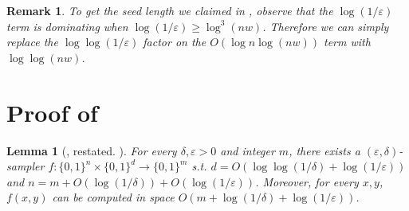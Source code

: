 \documentclass[10pt,a4paper]{article}
\newtheorem{lemma}[theorem]{Lemma}
\newtheorem{remark}[theorem]{Remark}
\newcommand{\bits}[1]{\{0,1\}^{#1}}
\newcommand{\eps}{\varepsilon}
\begin{document}
\begin{remark}
To get the seed length we claimed in , observe that the $\log(1/\eps)$ term is dominating when $\log(1/\eps)\ge \log^3(nw)$. Therefore we can simply replace the $\log\log(1/\eps)$ factor on the $O(\log n\log (nw))$ term with $\log\log(nw)$.
\end{remark}

\appendix
\setcounter{section}{1}
\section{Proof of }\label{sec:proof-of-samp}
\begin{lemma}[, restated. \cite{RVW01,Gol11}]
For every $\delta,\eps>0$ and integer $m$, there exists a $(\eps,\delta)$-sampler $f:\bits{n}\times\bits{d}\to\bits{m}$ s.t. $d=O(\log\log(1/\delta)+\log(1/\eps))$ and $n=m+O(\log(1/\delta))+O(\log(1/\eps))$. Moreover, for every $x,y$, $f(x,y)$ can be computed in space $O(m+\log(1/\delta)+\log(1/\eps))$.
\end{lemma}
\end{document}
